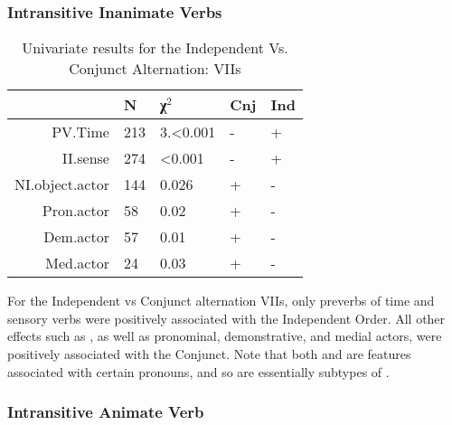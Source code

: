\FloatBarrier
\subsubsection{Intransitive Inanimate Verbs}

\begin{table}[h!]
  \centering
  \footnotesize
\begin{tabular}{rllll}
    \toprule
&N&χ$^{2}$&Cnj & Ind \\
\midrule
PV.Time & 213 & 3.\textless{}0.001 & - & + \\
II.sense & 274 & \textless{}0.001 & - & + \\
NI.object.actor & 144 & 0.026 & + & - \\
Pron.actor & 58 & 0.02 & + & - \\
Dem.actor & 57 & 0.01 & + & - \\
Med.actor & 24 & 0.03 & + & - \\
\bottomrule
  \end{tabular}
  \caption{
   Univariate results for the Independent Vs. Conjunct Alternation: VIIs \\ \label{tab:iincnjuni}
  }
\end{table}

For the Independent vs Conjunct alternation VIIs, only preverbs of time and sensory verbs were positively associated with the Independent Order. All other effects such as , as well as pronominal, demonstrative, and medial actors, were positively associated with the Conjunct. Note that both  and  are features associated with certain pronouns, and so are essentially subtypes of .
\FloatBarrier


\subsubsection{Intransitive Animate Verb}

